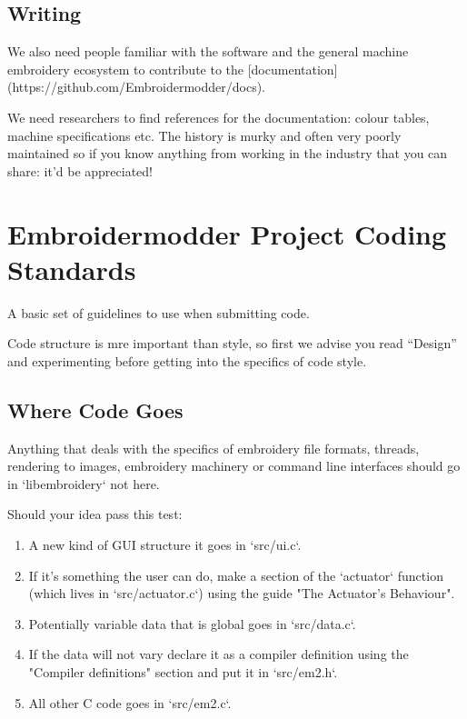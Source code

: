 \subsection{Writing}

We also need people familiar with the software and the general
machine embroidery ecosystem to contribute to the
[documentation](https://github.com/Embroidermodder/docs).

We need researchers to find references for the documentation: colour tables,
machine specifications etc. The history is murky and often very poorly maintained
so if you know anything from working in the industry that you can share: it'd be
appreciated!


\section{Embroidermodder Project Coding Standards}

A basic set of guidelines to use when submitting code.

Code structure is mre important than style, so first we advise you read ``Design'' and experimenting before getting into the specifics of code style.

\subsection{Where Code Goes}

Anything that deals with the specifics of embroidery file formats, threads, rendering to images, embroidery machinery or command line interfaces should go in `libembroidery` not here.

Should your idea pass this test:

\begin{enumerate}
\item A new kind of GUI structure it goes in `src/ui.c`.
\item If it's something the user can do, make a section of the `actuator` function (which lives in `src/actuator.c`) using the guide "The Actuator's Behaviour".
\item Potentially variable data that is global goes in `src/data.c`.
\item If the data will not vary declare it as a compiler definition using the "Compiler definitions" section and put it in `src/em2.h`.
\item All other C code goes in `src/em2.c`.
\end{enumerate}

